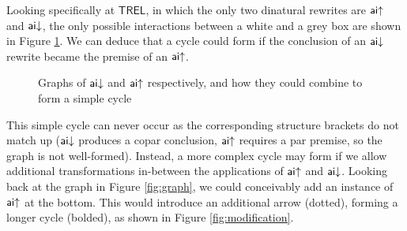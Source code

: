 \documentclass[11pt, oneside]{article}
\theoremstyle{plain}
\theoremstyle{definition}
\newcommand{\sSys}{{\mathsf{TREL}}}%
\begin{document}
Looking specifically at $\sSys$, in which the only two dinatural rewrites are ${\mathsf {ai}}{ \uparrow}$ and ${\mathsf {ai}}{\downarrow}$, the only possible interactions between a white and a grey box are shown in Figure \ref{fig:cycles}.
We can deduce that a cycle could form if the conclusion of an ${\mathsf {ai}}{\downarrow}$ rewrite became the premise of an ${\mathsf {ai}}{ \uparrow}$.
\begin{figure}[ht]
    \begin{minipage}[h]{0.3\textwidth}
        \centering
    \end{minipage}
    \hfill
    \begin{minipage}[h]{0.3\textwidth}
        \centering
    \end{minipage}
    \hfill
    \begin{minipage}[h]{0.3\textwidth}
        \centering
    \end{minipage}

    \caption{Graphs of ${\mathsf {ai}}{\downarrow}$ and ${\mathsf {ai}}{ \uparrow}$ respectively, and how they could combine to form a simple cycle}
    \label{fig:cycles}
\end{figure}

This simple cycle can never occur as the corresponding structure brackets do not match up (${\mathsf {ai}}{\downarrow}$ produces a copar conclusion, ${\mathsf {ai}}{ \uparrow}$ requires a par premise, so the graph is not well-formed).
Instead, a more complex cycle may form if we allow additional transformations in-between the applications of ${\mathsf {ai}}{ \uparrow}$ and ${\mathsf {ai}}{\downarrow}$.
Looking back at the graph in Figure \ref{fig:graph}, we could conceivably add an instance of ${\mathsf {ai}}{ \uparrow}$ at the bottom.
This would introduce an additional arrow (dotted), forming a longer cycle (bolded), as shown in Figure \ref{fig:modification}.
\end{document}
